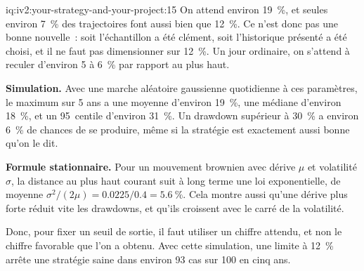 \begin{solution}{iq:iv2:your-strategy-and-your-project:15}
On attend environ 19~\%, et seules environ 7~\% des trajectoires font aussi bien que 12~\%. Ce n'est donc pas une bonne nouvelle~: soit l'échantillon a été clément, soit l'historique présenté a été choisi, et il ne faut pas dimensionner sur 12~\%. Un jour ordinaire, on s'attend à reculer d'environ 5 à 6~\% par rapport au plus haut.

\textbf{Simulation.} Avec une marche aléatoire gaussienne quotidienne à ces paramètres, le maximum sur 5 ans a une moyenne d'environ 19~\%, une médiane d'environ 18~\%, et un 95~centile d'environ 31~\%. Un drawdown supérieur à 30~\% a environ 6~\% de chances de se produire, même si la stratégie est exactement aussi bonne qu'on le dit.

\textbf{Formule stationnaire.} Pour un mouvement brownien avec dérive $\mu$ et volatilité $\sigma$, la distance au plus haut courant suit à long terme une loi exponentielle, de moyenne $\sigma^2/(2\mu) = 0.0225/0.4 = 5.6~\%$. Cela montre aussi qu'une dérive plus forte réduit vite les drawdowns, et qu'ils croissent avec le carré de la volatilité.

Donc, pour fixer un seuil de sortie, il faut utiliser un chiffre attendu, et non le chiffre favorable que l'on a obtenu. Avec cette simulation, une limite à 12~\% arrête une stratégie saine dans environ 93 cas sur 100 en cinq ans.

\end{solution}

